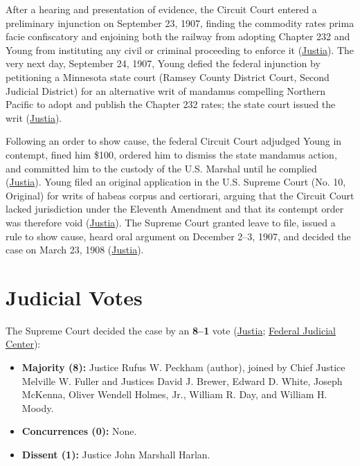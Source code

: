 \documentclass[12pt]{article}
\begin{document}
After a hearing and presentation of evidence, the Circuit Court entered a preliminary injunction on September 23, 1907, finding the commodity rates prima facie confiscatory and enjoining both the railway from adopting Chapter 232 and Young from instituting any civil or criminal proceeding to enforce it (\href{https://supreme.justia.com/cases/federal/us/209/123/}{Justia}). The very next day, September 24, 1907, Young defied the federal injunction by petitioning a Minnesota state court (Ramsey County District Court, Second Judicial District) for an alternative writ of mandamus compelling Northern Pacific to adopt and publish the Chapter 232 rates; the state court issued the writ (\href{https://supreme.justia.com/cases/federal/us/209/123/}{Justia}).

Following an order to show cause, the federal Circuit Court adjudged Young in contempt, fined him \$100, ordered him to dismiss the state mandamus action, and committed him to the custody of the U.S. Marshal until he complied (\href{https://supreme.justia.com/cases/federal/us/209/123/}{Justia}). Young filed an original application in the U.S. Supreme Court (No. 10, Original) for writs of habeas corpus and certiorari, arguing that the Circuit Court lacked jurisdiction under the Eleventh Amendment and that its contempt order was therefore void (\href{https://supreme.justia.com/cases/federal/us/209/123/}{Justia}). The Supreme Court granted leave to file, issued a rule to show cause, heard oral argument on December 2--3, 1907, and decided the case on March 23, 1908 (\href{https://supreme.justia.com/cases/federal/us/209/123/}{Justia}).

\section{Judicial Votes}

The Supreme Court decided the case by an \textbf{8--1} vote (\href{https://supreme.justia.com/cases/federal/us/209/123/}{Justia}; \href{https://www.fjc.gov/history/cases/cases-that-shaped-the-federal-courts/ex-parte-young}{Federal Judicial Center}):

\begin{itemize}
\item \textbf{Majority (8):} Justice Rufus W. Peckham (author), joined by Chief Justice Melville W. Fuller and Justices David J. Brewer, Edward D. White, Joseph McKenna, Oliver Wendell Holmes, Jr., William R. Day, and William H. Moody.
\item \textbf{Concurrences (0):} None.
\item \textbf{Dissent (1):} Justice John Marshall Harlan.
\end{itemize}
\end{document}
